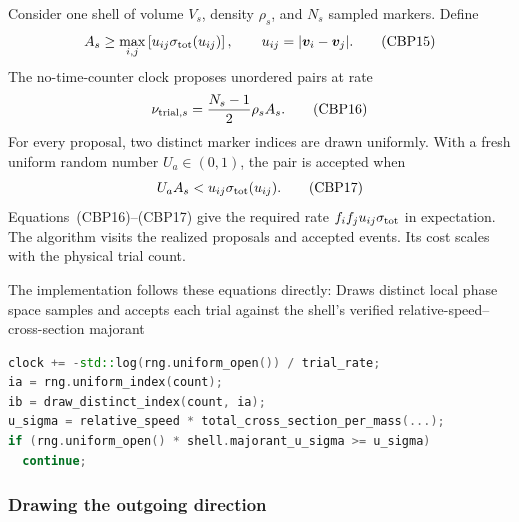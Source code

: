 Consider one shell of volume \(V_s\), density \(\rho_s\), and \(N_s\) sampled
markers.  Define
\[
  A_s\ge \max_{i,j}\left[u_{ij}\sigma_{\rm tot}(u_{ij})\right],
  \qquad u_{ij}=|\boldsymbol v_i-\boldsymbol v_j|.       \tag{CBP15}
\]
The no-time-counter clock proposes unordered pairs at rate
\[
  \nu_{{\rm trial},s}=\frac{N_s-1}{2}\rho_s A_s.        \tag{CBP16}
\]
For every proposal, two distinct marker indices are drawn uniformly.  With a
fresh uniform random number \(U_a\in(0,1)\), the pair is accepted when
\[
  U_a A_s<u_{ij}\sigma_{\rm tot}(u_{ij}).               \tag{CBP17}
\]
Equations~(CBP16)--(CBP17) give the required rate
\(f_i f_j u_{ij}\sigma_{\rm tot}\) in expectation.  The algorithm visits the
realized proposals and accepted events.  Its cost scales with the physical
trial count.

The implementation follows these equations directly:
{}
{Draws distinct local phase space samples and accepts each trial against the
 shell's verified relative-speed--cross-section majorant}
\begin{lstlisting}[language=C++]
clock += -std::log(rng.uniform_open()) / trial_rate;
ia = rng.uniform_index(count);
ib = draw_distinct_index(count, ia);
u_sigma = relative_speed * total_cross_section_per_mass(...);
if (rng.uniform_open() * shell.majorant_u_sigma >= u_sigma)
  continue;
\end{lstlisting}

\subsubsection{Drawing the outgoing direction}

